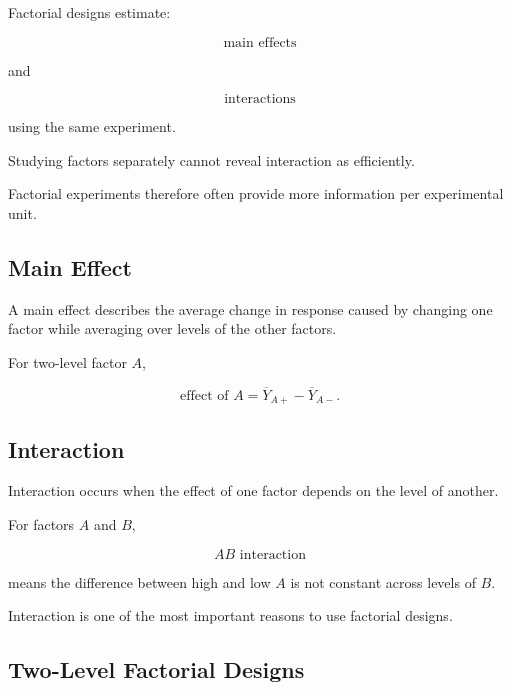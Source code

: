 Factorial designs estimate:

\[
\boxed{
\text{main effects}
}
\]

and

\[
\boxed{
\text{interactions}
}
\]

using the same experiment.

Studying factors separately cannot reveal interaction as efficiently.

Factorial experiments therefore often provide more information per
experimental unit.

\subsection{Main Effect}
\label{subsec:main-effect-design}

A main effect describes the average change in response caused by changing
one factor while averaging over levels of the other factors.

For two-level factor \(A\),

\[
\boxed{
\text{effect of }A
=
\overline{Y}_{A+}
-
\overline{Y}_{A-}.
}
\]

\subsection{Interaction}
\label{subsec:interaction-design}

Interaction occurs when the effect of one factor depends on the level of
another.

For factors \(A\) and \(B\),

\[
\boxed{
AB
\text{ interaction}
}
\]

means the difference between high and low \(A\) is not constant across
levels of \(B\).

Interaction is one of the most important reasons to use factorial
designs.

\subsection{Two-Level Factorial Designs}
\label{subsec:two-level-factorial-designs}

